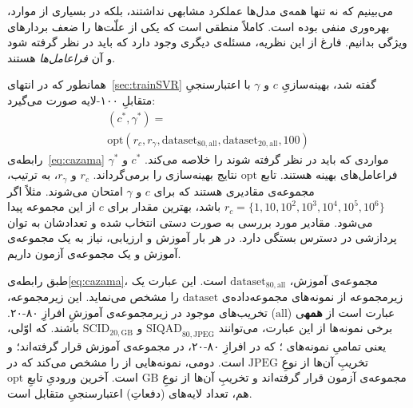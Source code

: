 \documentclass[twocolumn]{article}
\begin{document}
می‌بینیم که نه تنها همه‌ی مدل‌ها عملکرد مشابهی نداشتند، بلکه در بسیاری از موارد، بهره‌وری منفی بوده است. کاملاً منطقی است که یکی از علّت‌ها را ضعف بردارهای ویژگی بدانیم. فارغ از این نظریه، مسئله‌ی دیگری وجود دارد که باید در نظر گرفته شود و آن \emph{فراعامل‌ها} هستند. 

همانطور که در انتهای~\ref{sec:trainSVR} گفته شد، بهینه‌سازیِ $c$ و $\gamma$ با اعتبارسنجیِ متقابلِ ۱۰۰-لایه صورت می‌گیرد:
\begin{equation}
	\begin{aligned}
	(c^*, \gamma ^*) = \\
		\text{opt}(r_c, r_\gamma, \text{dataset}_{80, \text{all}}, \text{dataset}_{20, \text{all}}, 100)
	\end{aligned}
	\label{eq:cazama}
\end{equation}
رابطه‌ی~\ref{eq:cazama} مواردی که باید در نظر گرفته شوند را خلاصه می‌کند. $c^*$ و $\gamma^*$ فراعامل‌های بهینه هستند. تابع $\text{opt}$ نتایج بهینه‌سازی را برمی‌گرداند. $r_c$ و $r_\gamma$، به ترتیب، مجموعه‌ی مقادیری هستند که برای $c$ و $\gamma$ امتحان می‌شوند. مثلاً اگر $r_c = \{1, 10, 10^2, 10^3, 10^4, 10^5, 10^6\}$ باشد، بهترین مقدار برای $c$ از این مجموعه پیدا می‌شود. مقادیر مورد بررسی به صورت دستی انتخاب شده و تعدادشان به توان پردازشی در دسترس بستگی دارد. در هر بار آموزش و ارزیابی، نیاز به یک مجموعه‌ی آموزش و یک مجموعه‌ی آزمون داریم.

طبق رابطه‌ی\ref{eq:cazama}، مجموعه‌ی آموزش، $\text{dataset}_{80, \text{all}}$ است. این عبارت یک زیرمجموعه از نمونه‌های مجموعه‌داده‌ی $\text{dataset}$ را مشخص می‌نماید. این زیرمجموعه، عبارت است از \textbf{همه}ی ($\text{all}$) تخریب‌های موجود در زیرمجموعه‌ی آموزشِ افرازِ ۸۰-۲۰. برخی نمونه‌ها از این عبارت، می‌توانند $\text{SIQAD}_{80, \text{JPEG}}$ و $\text{SCID}_{20, \text{GB}}$ باشند. که اوّلی، یعنی تمامیِ نمونه‌های ؛ که در افرازِ ۸۰-۲۰، در مجموعه‌ی آموزش قرار گرفته‌اند؛ و تخریبِ آن‌ها از نوعِ $\text{JPEG}$ است. دومی، نمونه‌هایی از  را مشخص می‌کند که در مجموعه‌ی آزمون قرار گرفته‌اند و تخریبِ آن‌ها از نوعِ $\text{GB}$ است. آخرین ورودیِ تابعِ $\text{opt}$ هم، تعداد لایه‌های (دفعاتِ) اعتبارسنجیِ متقابل است.
\end{document}
